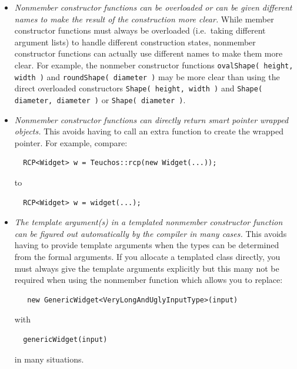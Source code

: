 \documentclass[pdf,ps2pdf,11pt]{SANDreport}
\begin{document}
\begin{itemize}

{}\item\textit{Nonmember constructor functions can be overloaded or can be
given different names to make the result of the construction more clear.}
While member constructor functions must always be overloaded (i.e.\ taking
different argument lists) to handle different construction states, nonmember
constructor functions can actually use different names to make them more
clear.  For example, the nonmeber constructor functions {}\texttt{ovalShape(
height, width )} and {}\texttt{roundShape( diameter )} may be more clear than
using the direct overloaded constructors {}\texttt{Shape( height, width )} and
{}\texttt{Shape( diameter, diameter )} or {}\texttt{Shape( diameter )}.

{}\item\textit{Nonmember constructor functions can directly return smart
pointer wrapped objects.}  This avoids having to call an extra function to
create the wrapped pointer.  For example, compare:

{\small\begin{verbatim}
  RCP<Widget> w = Teuchos::rcp(new Widget(...));
\end{verbatim}}

to

{\small\begin{verbatim}
  RCP<Widget> w = widget(...);
\end{verbatim}}

{}\item\textit{The template argument(s) in a templated nonmember constructor
function can be figured out automatically by the compiler in many cases.}
This avoids having to provide template arguments when the types can be
determined from the formal arguments.  If you allocate a templated class
directly, you must always give the template arguments explicitly but this many
not be required when using the nonmember function which allows you to replace:

{\small\begin{verbatim}
   new GenericWidget<VeryLongAndUglyInputType>(input)
\end{verbatim}}

with

{\small\begin{verbatim}
  genericWidget(input)
\end{verbatim}}

in many situations.


\end{itemize}
\end{document}
